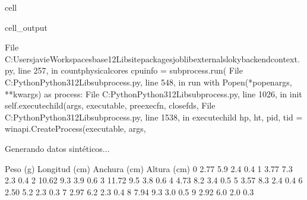 \documentclass[a4paper,10pt,spanish]{jupyterBook}
\begin{document}
\begin{sphinxuseclass}{cell}
\begin{sphinxVerbatimOutput}
\begin{sphinxuseclass}{cell_output}
\begin{sphinxVerbatim}[commandchars=\\\{\}]
  File \PYGZdq{}C:\PYGZbs{}Users\PYGZbs{}javie\PYGZbs{}Workspaces\PYGZbs{}base12\PYGZbs{}Lib\PYGZbs{}site\PYGZhy{}packages\PYGZbs{}joblib\PYGZbs{}externals\PYGZbs{}loky\PYGZbs{}backend\PYGZbs{}context.py\PYGZdq{}, line 257, in \PYGZus{}count\PYGZus{}physical\PYGZus{}cores
    cpu\PYGZus{}info = subprocess.run(
               \PYGZca{}\PYGZca{}\PYGZca{}\PYGZca{}\PYGZca{}\PYGZca{}\PYGZca{}\PYGZca{}\PYGZca{}\PYGZca{}\PYGZca{}\PYGZca{}\PYGZca{}\PYGZca{}\PYGZca{}
  File \PYGZdq{}C:\PYGZbs{}Python\PYGZbs{}Python312\PYGZbs{}Lib\PYGZbs{}subprocess.py\PYGZdq{}, line 548, in run
    with Popen(*popenargs, **kwargs) as process:
         \PYGZca{}\PYGZca{}\PYGZca{}\PYGZca{}\PYGZca{}\PYGZca{}\PYGZca{}\PYGZca{}\PYGZca{}\PYGZca{}\PYGZca{}\PYGZca{}\PYGZca{}\PYGZca{}\PYGZca{}\PYGZca{}\PYGZca{}\PYGZca{}\PYGZca{}\PYGZca{}\PYGZca{}\PYGZca{}\PYGZca{}\PYGZca{}\PYGZca{}\PYGZca{}\PYGZca{}
  File \PYGZdq{}C:\PYGZbs{}Python\PYGZbs{}Python312\PYGZbs{}Lib\PYGZbs{}subprocess.py\PYGZdq{}, line 1026, in \PYGZus{}\PYGZus{}init\PYGZus{}\PYGZus{}
    self.\PYGZus{}execute\PYGZus{}child(args, executable, preexec\PYGZus{}fn, close\PYGZus{}fds,
  File \PYGZdq{}C:\PYGZbs{}Python\PYGZbs{}Python312\PYGZbs{}Lib\PYGZbs{}subprocess.py\PYGZdq{}, line 1538, in \PYGZus{}execute\PYGZus{}child
    hp, ht, pid, tid = \PYGZus{}winapi.CreateProcess(executable, args,
                       \PYGZca{}\PYGZca{}\PYGZca{}\PYGZca{}\PYGZca{}\PYGZca{}\PYGZca{}\PYGZca{}\PYGZca{}\PYGZca{}\PYGZca{}\PYGZca{}\PYGZca{}\PYGZca{}\PYGZca{}\PYGZca{}\PYGZca{}\PYGZca{}\PYGZca{}\PYGZca{}\PYGZca{}\PYGZca{}\PYGZca{}\PYGZca{}\PYGZca{}\PYGZca{}\PYGZca{}\PYGZca{}\PYGZca{}\PYGZca{}\PYGZca{}\PYGZca{}\PYGZca{}\PYGZca{}\PYGZca{}\PYGZca{}\PYGZca{}\PYGZca{}\PYGZca{}
\end{sphinxVerbatim}

\begin{sphinxVerbatim}[commandchars=\\\{\}]
Generando datos sintéticos...
\end{sphinxVerbatim}

\begin{sphinxVerbatim}[commandchars=\\\{\}]
   Peso (g)  Longitud (cm)  Anchura (cm)  Altura (cm)
0      2.77            5.9           2.4          0.4
1      3.77            7.3           2.3          0.4
2     10.62            9.3           3.9          0.6
3     11.72            9.5           3.8          0.6
4      4.73            8.2           3.4          0.5
5      3.57            8.3           2.4          0.4
6      2.50            5.2           2.3          0.3
7      2.97            6.2           2.3          0.4
8      7.94            9.3           3.0          0.5
9      2.92            6.0           2.0          0.3
\end{sphinxVerbatim}


\end{sphinxuseclass}
\end{sphinxVerbatimOutput}
\end{sphinxuseclass}
\end{document}
